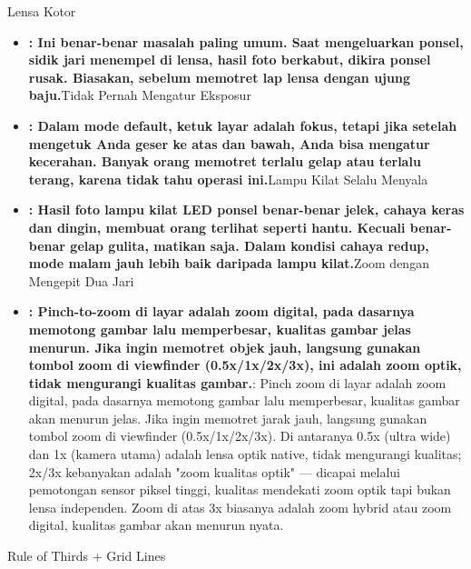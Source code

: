


Lensa Kotor

\begin{itemize}
  \item \textbf{: Ini benar-benar masalah paling umum. Saat mengeluarkan ponsel, sidik jari menempel di lensa, hasil foto berkabut, dikira ponsel rusak. Biasakan, sebelum memotret lap lensa dengan ujung baju.}Tidak Pernah Mengatur Eksposur
  \item \textbf{: Dalam mode default, ketuk layar adalah fokus, tetapi jika setelah mengetuk Anda geser ke atas dan bawah, Anda bisa mengatur kecerahan. Banyak orang memotret terlalu gelap atau terlalu terang, karena tidak tahu operasi ini.}Lampu Kilat Selalu Menyala
  \item \textbf{: Hasil foto lampu kilat LED ponsel benar-benar jelek, cahaya keras dan dingin, membuat orang terlihat seperti hantu. Kecuali benar-benar gelap gulita, matikan saja. Dalam kondisi cahaya redup, mode malam jauh lebih baik daripada lampu kilat.}Zoom dengan Mengepit Dua Jari
  \item \textbf{: Pinch-to-zoom di layar adalah zoom digital, pada dasarnya memotong gambar lalu memperbesar, kualitas gambar jelas menurun. Jika ingin memotret objek jauh, langsung gunakan tombol zoom di viewfinder (0.5x/1x/2x/3x), ini adalah zoom optik, tidak mengurangi kualitas gambar.}: Pinch zoom di layar adalah zoom digital, pada dasarnya memotong gambar lalu memperbesar, kualitas gambar akan menurun jelas. Jika ingin memotret jarak jauh, langsung gunakan tombol zoom di viewfinder (0.5x/1x/2x/3x). Di antaranya 0.5x (ultra wide) dan 1x (kamera utama) adalah lensa optik native, tidak mengurangi kualitas; 2x/3x kebanyakan adalah "zoom kualitas optik" — dicapai melalui pemotongan sensor piksel tinggi, kualitas mendekati zoom optik tapi bukan lensa independen. Zoom di atas 3x biasanya adalah zoom hybrid atau zoom digital, kualitas gambar akan menurun nyata.
\end{itemize}


Rule of Thirds + Grid Lines

